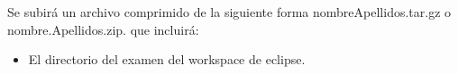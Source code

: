 \documentclass[addpoints,12pt]{exam}
\begin{document}
\vspace*{1cm}
\begin{center}
\end{center}
Se subirá un archivo comprimido de la siguiente forma nombreApellidos.tar.gz o nombre.Apellidos.zip. que incluirá:
\begin{itemize}
\item El directorio del examen del workspace de eclipse.
\end{itemize}
\end{document}

